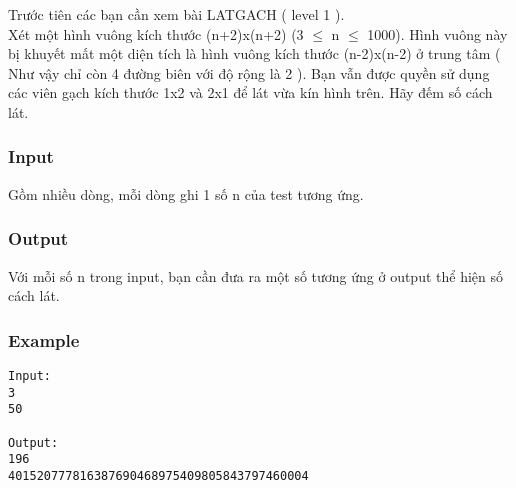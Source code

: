 



   Trước tiên các bạn cần xem bài LATGACH ( level 1 ).   
\\   Xét một hình vuông kích thước (n+2)x(n+2) (3 $\le$ n $\le$ 1000). Hình vuông này bị khuyết mất một diện tích là hình vuông kích thước (n-2)x(n-2) ở trung tâm ( Như vậy chỉ còn 4 đường biên với độ rộng là 2 ). Bạn vẫn được quyền sử dụng các viên gạch kích thước 1x2 và 2x1 để lát vừa kín hình trên. Hãy đếm số cách lát.  

\subsubsection{   Input  }

   Gồm nhiều dòng, mỗi dòng ghi 1 số n của test tương ứng.  

\subsubsection{   Output  }

   Với mỗi số n trong input, bạn cần đưa ra một số tương ứng ở output thể hiện số cách lát.  

\subsubsection{   Example  }
\begin{verbatim}
Input:
3
50

Output:
196
401520777816387690468975409805843797460004
\end{verbatim}
